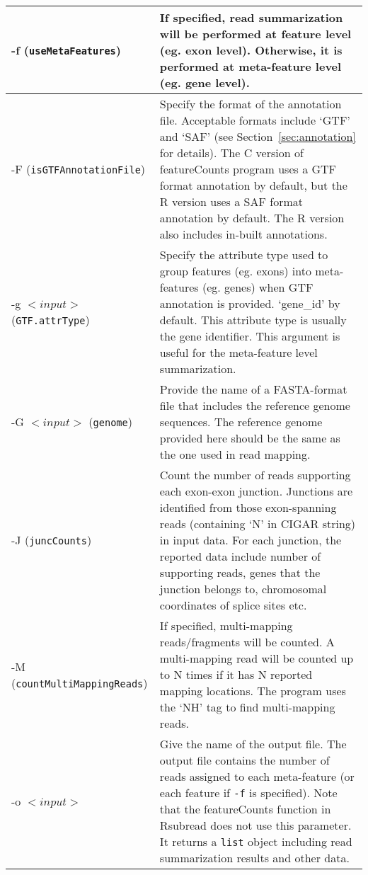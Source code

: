 \documentclass[12pt]{report}
\newcommand{\code}[1]{{\small\texttt{#1}}}
\newcommand{\Rsubread}{\textsf{Rsubread}}
\newcommand{\featureCounts}{\textsf{featureCounts}}
\newcommand{\C}{\textsf{C}}
\begin{document}
\begin{longtable}{|p{5cm}|p{11cm}|}
\hline
-f \newline (\code{useMetaFeatures}) & If specified, read summarization will be performed at feature level (eg. exon level). Otherwise, it is performed at meta-feature level (eg. gene level).\\
\hline
-F \newline (\code{isGTFAnnotationFile}) & Specify the format of the annotation file. Acceptable formats include `GTF' and `SAF' (see Section~\ref{sec:annotation} for details). The {\C} version of {\featureCounts} program uses a GTF format annotation by default, but the R version uses a SAF format annotation by default. The R version also includes in-built annotations.\\
\hline
-g $<input>$ \newline (\code{GTF.attrType}) & Specify the attribute type used to group features (eg. exons) into meta-features (eg. genes) when GTF annotation is provided. `gene\_id' by default. This attribute type is usually the gene identifier. This argument is useful for the meta-feature level summarization.\\
\hline
-G $<input>$ \newline (\code{genome}) & Provide the name of a FASTA-format file that includes the reference genome sequences. The reference genome provided here should be the same as the one used in read mapping.\\
\hline
-J \newline (\code{juncCounts}) & Count the number of reads supporting each exon-exon junction. Junctions are identified from those exon-spanning reads (containing `N' in CIGAR string) in input data. For each junction, the reported data include number of supporting reads, genes that the junction belongs to, chromosomal coordinates of splice sites etc.\\
\hline
-M \newline (\code{countMultiMappingReads}) & If specified, multi-mapping reads/fragments will be counted. A multi-mapping read will be counted up to N times if it has N reported mapping locations. The program uses the `NH' tag to find multi-mapping reads.\\
\hline
-o $<input>$ & Give the name of the output file. The output file contains the number of reads assigned to each meta-feature (or each feature if \code{-f} is specified). Note that the {\featureCounts} function in {\Rsubread} does not use this parameter. It returns a \code{list} object including read summarization results and other data. \\

\end{longtable}
\end{document}

